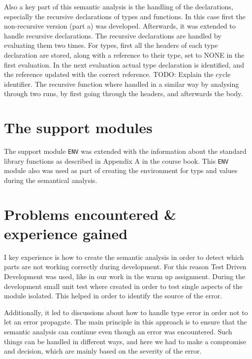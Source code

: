 \documentclass{article}
\begin{document}
Also a key part of this semantic analysis is the handling of the declarations, especially the recursive declarations of types and functions. In this case first the non-recursive version (part a) was developed. Afterwards, it was extended to handle recursive declarations. The recursive declarations are handled by evaluating them two times. For types, first all the headers of each type declaration are stored, along with a reference to their type, set to NONE in the first evaluation. In the next evaluation actual type declaration is identified, and the reference updated with the correct reference. TODO: Explain the cycle identifier. The recursive function where handled in a similar way by analysing through two runs, by first going through the headers, and afterwards the body.  

\section{The support modules}

The support module \texttt{ENV} was extended with the information about the standard library functions as described in Appendix A in the course book. This \texttt{ENV} module also was used as part of creating the environment for typs and values during the semantical analysis. 


\section{Problems encountered \& experience gained}

I key experience is how to create the semantic analysis in order to detect which parts are not working correctly during development. For this reason Test Driven Development was used, like in our work in the warm up assignment. During the development small unit test where created in order to test single aspects of the module isolated. This helped in order to identify the source of the error.

Additionally, it led to discussions about how to handle type error in order not to let an error propagate. The main principle in this approach is to ensure that the semantic analysis can continue even though an error was encountered. Such things can be handled in different ways, and here we had to make a compromise and decision, which are mainly based on the severity of the error.
\end{document}
